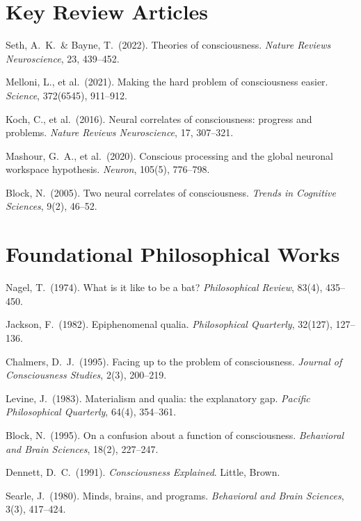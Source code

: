 \documentclass[11pt,a4paper]{report}
\begin{document}
\section*{Key Review Articles}
\begin{enumerate}[label={[\arabic*]}, leftmargin=2.5em, start=6]
  \item Seth, A.\ K.\ \& Bayne, T.\ (2022). Theories of consciousness. \textit{Nature Reviews Neuroscience}, 23, 439--452.
  \item Melloni, L., et al.\ (2021). Making the hard problem of consciousness easier. \textit{Science}, 372(6545), 911--912.
  \item Koch, C., et al.\ (2016). Neural correlates of consciousness: progress and problems. \textit{Nature Reviews Neuroscience}, 17, 307--321.
  \item Mashour, G.\ A., et al.\ (2020). Conscious processing and the global neuronal workspace hypothesis. \textit{Neuron}, 105(5), 776--798.
  \item Block, N.\ (2005). Two neural correlates of consciousness. \textit{Trends in Cognitive Sciences}, 9(2), 46--52.
\end{enumerate}

\section*{Foundational Philosophical Works}
\begin{enumerate}[label={[\arabic*]}, leftmargin=2.5em, start=11]
  \item Nagel, T.\ (1974). What is it like to be a bat? \textit{Philosophical Review}, 83(4), 435--450.
  \item Jackson, F.\ (1982). Epiphenomenal qualia. \textit{Philosophical Quarterly}, 32(127), 127--136.
  \item Chalmers, D.\ J.\ (1995). Facing up to the problem of consciousness. \textit{Journal of Consciousness Studies}, 2(3), 200--219.
  \item Levine, J.\ (1983). Materialism and qualia: the explanatory gap. \textit{Pacific Philosophical Quarterly}, 64(4), 354--361.
  \item Block, N.\ (1995). On a confusion about a function of consciousness. \textit{Behavioral and Brain Sciences}, 18(2), 227--247.
  \item Dennett, D.\ C.\ (1991). \textit{Consciousness Explained}. Little, Brown.
  \item Searle, J.\ (1980). Minds, brains, and programs. \textit{Behavioral and Brain Sciences}, 3(3), 417--424.
\end{enumerate}
\end{document}
